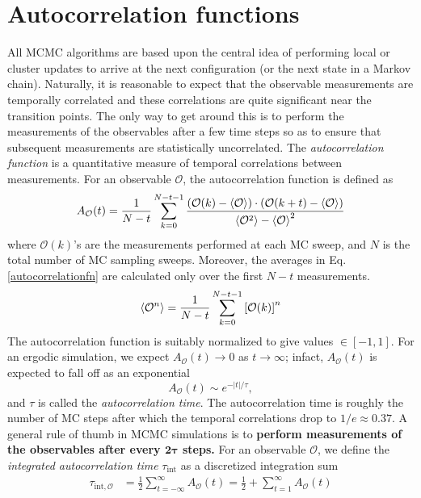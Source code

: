 \documentclass[../thesis_main.tex]{subfiles}
\begin{document}
\section{Autocorrelation functions}
All MCMC algorithms are based upon the central idea of performing local or cluster updates to arrive at the next configuration (or the next state in a Markov chain). Naturally, it is reasonable to expect that the observable measurements are temporally correlated and these correlations are quite significant near the transition points. The only way to get around this is to perform the measurements of the observables after a few time steps so as to ensure that subsequent measurements are statistically uncorrelated.  The \textit{autocorrelation function} is a quantitative measure of temporal correlations between measurements. For an observable $\mathcal{O}$, the autocorrelation function is defined as
\begin{equation}
    A_\mathcal{O}(t) =   \frac{1}{N-t} \sum_{k=0}^{N-t-1}\frac{\qty(\mathcal{O}(k) - \expval{\mathcal{O}})\cdot\qty(\mathcal{O}(k+t) - \expval{\mathcal{O}})}{\expval{\mathcal{O}^2} - \expval{\mathcal{O}}^2}
    \label{autocorrelationfn}
\end{equation}  
where $\mathcal{O}(k)$'s are the measurements performed at each MC sweep, and $N$ is the total number of MC sampling sweeps. Moreover, the averages in Eq. \eqref{autocorrelationfn} are calculated only over the first $N-t$ measurements. 
\begin{equation}
    \expval{\mathcal{O}^n} = \frac{1}{N-t} \sum_{k=0}^{N-t-1} \qty[\mathcal{O}(k)]^n
\end{equation}
The autocorrelation function is suitably normalized to give values $\in [-1,1]$. For an ergodic simulation, we expect $A_\mathcal{O}(t) \to 0$ as $t \to \infty$; infact, $A_\mathcal{O}(t)$ is expected to fall off as an exponential
\begin{equation}
    A_\mathcal{O}(t) \sim e^{-|t|/\tau },
\end{equation}
and $\tau $ is called the \textit{autocorrelation time}. The autocorrelation time is roughly the number of MC steps after which the temporal correlations drop to $1/e \approx 0.37$. A general rule of thumb in MCMC simulations is to \textbf{perform measurements of the observables after every $\boldsymbol{2} \boldsymbol{\tau}$ steps.} For an observable $\mathcal{O}$, we define the \textit{integrated autocorrelation time} $\tau_\text{int}$ as a discretized integration sum
\begin{align}
    \tau _{\text{int},\mathcal{O}} & = \frac{1}{2} \sum_{t= -\infty}^{\infty} A_\mathcal{O}(t) = \frac{1}{2} + \sum_{t=1}^{\infty} A_\mathcal{O}(t) 
    \label{autocorsum}
\end{align}   
\end{document}
